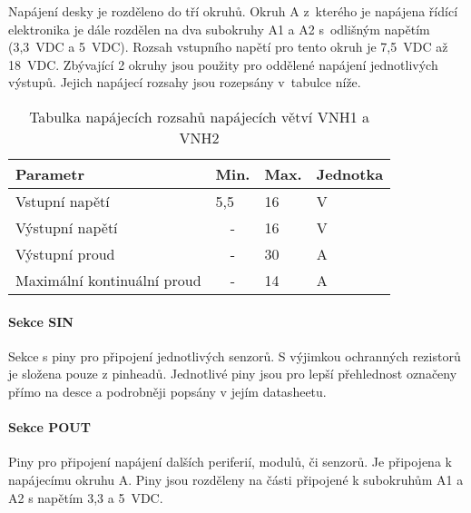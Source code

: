 Napájení desky je rozděleno do tří okruhů. 
Okruh A z~kterého je napájena řídící elektronika je dále rozdělen na dva subokruhy A1 a A2 s~odlišným napětím (3,3~VDC a 5~VDC).
Rozsah vstupního napětí pro tento okruh je 7,5~VDC až 18~VDC.
Zbývající 2 okruhy jsou použity pro oddělené napájení jednotlivých výstupů. 
Jejich napájecí rozsahy jsou rozepsány v~tabulce níže.
\begin{table}[h]
    \centering
    \begin{tabular}{llll}
        \hline
        \multicolumn{1}{|l|}{\textbf{Parametr}}           & \multicolumn{1}{l|}{\textbf{Min.}} & \multicolumn{1}{l|}{\textbf{Max.}} & \multicolumn{1}{l|}{\textbf{Jednotka}} \\ \hline
        \multicolumn{1}{|l|}{Vstupní napětí}              & \multicolumn{1}{l|}{5,5}           & \multicolumn{1}{l|}{16}            & \multicolumn{1}{l|}{V}                 \\ \hline
        \multicolumn{1}{|l|}{Výstupní napětí}             & \multicolumn{1}{c|}{-}             & \multicolumn{1}{l|}{16}            & \multicolumn{1}{l|}{V}                 \\ \hline
        \multicolumn{1}{|l|}{Výstupní proud}              & \multicolumn{1}{c|}{-}             & \multicolumn{1}{l|}{30}            & \multicolumn{1}{l|}{A}                 \\ \hline
        \multicolumn{1}{|l|}{Maximální kontinuální proud} & \multicolumn{1}{c|}{-}             & \multicolumn{1}{l|}{14}            & \multicolumn{1}{l|}{A}                 \\ \hline
    \end{tabular}
    \caption{Tabulka napájecích rozsahů napájecích větví VNH1 a VNH2}
\end{table}

\paragraph{Sekce SIN}
Sekce s piny pro připojení jednotlivých senzorů. 
S výjimkou ochranných rezistorů je složena pouze z pinheadů.
Jednotlivé piny jsou pro lepší přehlednost označeny přímo na desce a podrobněji popsány v jejím datasheetu. 

\paragraph{Sekce POUT} 
Piny pro připojení napájení dalších periferií, modulů, či senzorů.
Je připojena k napájecímu okruhu A.
Piny jsou rozděleny na části připojené k subokruhům A1 a A2 s napětím 3,3 a 5~VDC.

